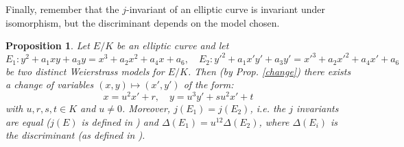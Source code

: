 \documentclass[12pt]{article}
\newtheorem{prop}{Proposition}
\theoremstyle{definition}
\begin{document}
Finally, remember that the $j$-invariant of an elliptic curve is invariant under isomorphism, but the discriminant depends on the model chosen.

\begin{prop}
Let $E/K$ be an elliptic curve and let
$$ E_1: y^2+a_1xy+a_3y=x^3+a_2x^2+a_4x+a_6, \quad E_2: y'^2+a_1x'y'+a_3y'=x'^3+a_2x'^2+a_4x'+a_6$$
be two distinct Weierstrass models for $E/K$. Then (by Prop. \ref{change}) there exists a change of variables $(x,y)\mapsto (x',y')$ of the form:
$$x=u^2x'+r,\quad y=u^3y'+su^2x'+t$$ 
with $u,r,s,t\in K$ and $u\neq 0$. Moreover, $j(E_1)=j(E_2)$, i.e. the $j$ invariants are equal ($j(E)$ is defined in ) and $\Delta(E_1)=u^{12}\Delta(E_2)$, where $\Delta(E_i)$ is the discriminant (as defined in ).
\end{prop}
\end{document}
